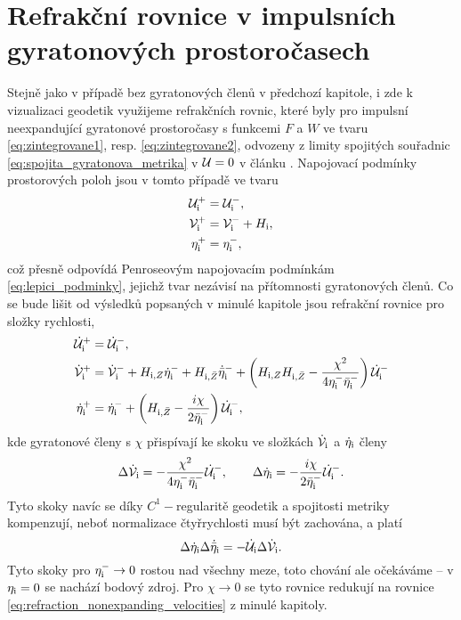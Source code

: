\section{Refrakční rovnice v impulsních gyratonových prostoročasech}
Stejně jako v případě bez gyratonových členů v předchozí kapitole, i zde k vizualizaci geodetik využijeme refrakčních rovnic,
které byly pro impulsní neexpandující gyratonové prostoročasy s funkcemi $F$ a $W$ ve tvaru
\eqref{eq:zintegrovane1}, resp. \eqref{eq:zintegrovane2}, odvozeny z limity spojitých souřadnic \eqref{eq:spojita_gyratonova_metrika}
v $\mathcal{U} = 0$ v článku \cite{Podolsky_2017}.
Napojovací podmínky prostorových poloh jsou v tomto případě ve tvaru
\begin{equation}
    \label{eq:refrakcni_rovnice_gyra_polohy}
    \begin{split}
        \mathcal{U}_{\mathrm{i}}^{+} &= \mathcal{U}_{\mathrm{i}}^{-}, \\
        \mathcal{V}_{\mathrm{i}}^{+} &= \mathcal{V}_{\mathrm{i}}^{-} + H_{\mathrm{i}}, \\
        \eta_{\mathrm{i}}^{+} &= \eta_{\mathrm{i}}^{-},
    \end{split}
\end{equation}
což přesně odpovídá Penroseovým napojovacím podmínkám \eqref{eq:lepici_podminky},
jejichž tvar nezávisí na přítomnosti gyratonových členů. Co se bude lišit od
výsledků popsaných v minulé kapitole jsou refrakční rovnice pro složky rychlosti,
\begin{equation}
    \label{eq:refrakcni_rovnice_gyra_rychlosti}
    \begin{split}
        \dot{\mathcal{U}}_{\mathrm{i}}^{+} &= \dot{\mathcal{U}}_{\mathrm{i}}^{-}, \\
        \dot{\mathcal{V}}_{\mathrm{i}}^{+} &= \dot{\mathcal{V}}_{\mathrm{i}}^{-} + H_{\mathrm{i}, Z} \dot{\eta}_{\mathrm{i}}^{-} + H_{\mathrm{i}, \bar{Z}} \dot{\bar{\eta}}_{\mathrm{i}}^{-} + \left(H_{\mathrm{i}, Z} H_{\mathrm{i}, \bar{Z}} - \frac{\chi^2}{4 \eta_{\mathrm{i}}^{-} \bar{\eta}_{\mathrm{i}}^{-}}\right) \dot{\mathcal{U}}_{\mathrm{i}}^{-} \\
        \dot{\eta}_{\mathrm{i}}^{+} &= \dot{\eta}_{\mathrm{i}}^{-} + \left(H_{\mathrm{i}, \bar{Z}} - \frac{i \chi}{2 \bar{\eta}_{\mathrm{i}}^{-}}\right) \dot{\mathcal{U}}_{\mathrm{i}}^{-},
    \end{split} 
\end{equation}
kde gyratonové členy s $\chi$ přispívají ke skoku ve složkách $\dot{\mathcal{V}}_{\mathrm{i}}$ a $\dot{\eta}_{\mathrm{i}}$ členy
\begin{equation}
    \Delta \dot{\mathcal{V}}_{\mathrm{i}} = -\frac{\chi^2}{4 \eta_{\mathrm{i}}^{-} \bar{\eta}_{\mathrm{i}}^{-}} \dot{\mathcal{U}}_{\mathrm{i}}^{-}, ~~~~~~ \Delta \dot{\eta}_{\mathrm{i}} = -\frac{i \chi}{2 \bar{\eta}_{\mathrm{i}}^{-}} \dot{\mathcal{U}}_{\mathrm{i}}^{-}.
\end{equation}
Tyto skoky navíc se díky $C^1-$regularitě geodetik a spojitosti metriky kompenzují, neboť normalizace čtyřrychlosti musí být zachována, a platí
\begin{equation}
    \Delta \dot{\eta}_{\mathrm{i}} \Delta \dot{\bar{\eta}}_{\mathrm{i}} = - \dot{\mathcal{U}}_{\mathrm{i}} \Delta \dot{\mathcal{V}}_{\mathrm{i}}.
\end{equation}
Tyto skoky pro $\eta_{\mathrm{i}}^{-} \to 0$ rostou nad všechny meze, toto chování ale očekáváme -- v $\eta_{\mathrm{i}} = 0$ se nachází bodový zdroj.
Pro $\chi \to 0$ se tyto rovnice redukují na rovnice \eqref{eq:refraction_nonexpanding_velocities} z minulé kapitoly.

